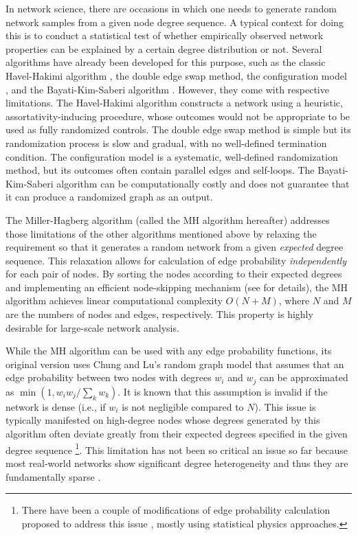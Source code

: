 \documentclass{llncs}
\begin{document}
In network science, there are occasions in which one needs to generate
random network samples from a given node degree sequence. A typical
context for doing this is to conduct a statistical test of whether
empirically observed network properties can be explained by a certain
degree distribution or not. Several algorithms have already been
developed for this purpose, such as the classic Havel-Hakimi algorithm
\cite{hakimi1962realizability}, the double edge swap method, the
configuration model \cite{bender1978asymptotic,newman2003structure}, and the
Bayati-Kim-Saberi algorithm \cite{bayati2010sequential}. However, they
come with respective limitations. The Havel-Hakimi algorithm
constructs a network using a heuristic, assortativity-inducing
procedure, whose outcomes would not be appropriate to be used as fully
randomized controls. The double edge swap method is simple but its
randomization process is slow and gradual, with no well-defined
termination condition. The configuration model is a systematic,
well-defined randomization method, but its outcomes often contain
parallel edges and self-loops. The Bayati-Kim-Saberi algorithm can be
computationally costly and does not guarantee that it can produce a
randomized graph as an output.

The Miller-Hagberg algorithm \cite{miller2011efficient} (called the MH
algorithm hereafter) addresses those limitations of the other
algorithms mentioned above by relaxing the requirement so that it
generates a random network from a given {\em expected} degree
sequence. This relaxation allows for calculation of edge probability
{\em independently} for each pair of nodes. By sorting the nodes
according to their expected degrees and implementing an efficient
node-skipping mechanism (see \cite{miller2011efficient} for details),
the MH algorithm achieves linear computational complexity $O(N+M)$,
where $N$ and $M$ are the numbers of nodes and edges,
respectively. This property is highly desirable for large-scale
network analysis.

While the MH algorithm can be used with any edge probability
functions, its original version uses Chung and Lu's random graph model
\cite{chung2002connected} that assumes that an edge probability
between two nodes with degrees $w_i$ and $w_j$ can be approximated as
$\min(1, w_iw_j / \sum_k w_k)$. It is known that this assumption is invalid if
the network is dense (i.e., if $w_i$ is not negligible compared to
$N$). This issue is typically manifested on high-degree nodes whose
degrees generated by this algorithm often deviate greatly from their
expected degrees specified in the given degree sequence
\cite{miller2011efficient}\footnote{There have been a couple of
  modifications of edge probability calculation proposed to address
  this issue \cite{britton2006generating,van2013critical}, mostly
  using statistical physics approaches.}. This limitation has not been
so critical an issue so far because most real-world networks show
significant degree heterogeneity and thus they are fundamentally
sparse \cite{del2011all}.
\end{document}
